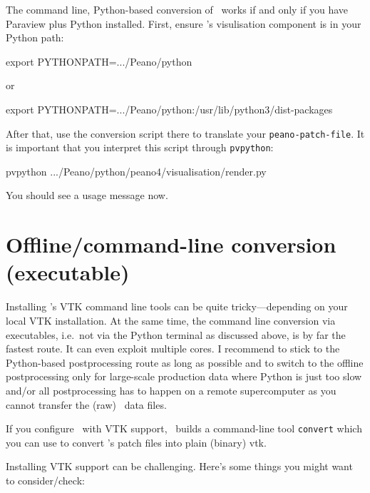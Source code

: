 \noindent
The command line, Python-based conversion of \Peano\ works if and only if you
have Paraview plus Python installed.
First, ensure \Peano's visulisation component is in your Python path:
\begin{code}
export PYTHONPATH=.../Peano/python  
\end{code}

\noindent
or

\begin{code}
export PYTHONPATH=.../Peano/python:/usr/lib/python3/dist-packages  
\end{code}


\noindent
After that, use the conversion script there to translate your
\texttt{peano-patch-file}. It is important that you interpret this script
through \texttt{pvpython}:

\begin{code}
pvpython .../Peano/python/peano4/visualisation/render.py 
\end{code}

\noindent
You should see a usage message now. 


\section{Offline/command-line conversion (executable)}
\label{section:postprocessing:command-line}


Installing \Peano's VTK command line tools can be quite tricky---depending on your
local VTK installation.
At the same time, the command line conversion via executables, i.e.~not via the 
Python terminal as discussed above, is by far the fastest route.
It  can even exploit multiple cores.
I recommend to stick to the Python-based postprocessing route as long as possible 
and to switch to the offline postprocessing only for large-scale production data
where Python is just too slow and/or all postprocessing has to happen on a remote 
supercomputer as you cannot transfer the (raw) \Peano\ data files.


\begin{remark}
  If you configure \Peano\ with VTK support, \Peano\ builds a command-line tool
  \texttt{convert} which you can use to convert \Peano 's patch files into plain
  (binary) vtk.
\end{remark}



\noindent
Installing VTK support can be challenging. 
Here's some things you might want to consider/check:

